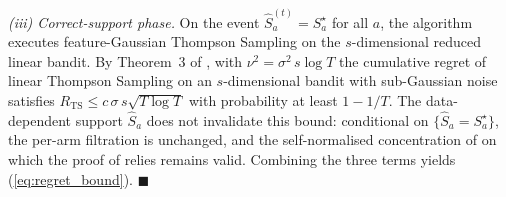 \documentclass[10pt,journal,twoside,twocolumn]{IEEEtran}
\begin{document}
\emph{(iii) Correct-support phase.} On the event $\hat{S}_a^{(t)} = S^\star_a$ for all $a$, the algorithm executes feature-Gaussian Thompson Sampling on the $s$-dimensional reduced linear bandit. By Theorem~3 of \cite{abeille2017linear}, with $\nu^2 = \sigma^2\, s\log T$ the cumulative regret of linear Thompson Sampling on an $s$-dimensional bandit with sub-Gaussian noise satisfies $R_{\mathrm{TS}} \leq c\,\sigma\,s\sqrt{T\log T}$ with probability at least $1 - 1/T$. The data-dependent support $\hat{S}_a$ does not invalidate this bound: conditional on $\{\hat{S}_a = S^\star_a\}$, the per-arm filtration is unchanged, and the self-normalised concentration of \cite{abbasi2011improved} on which the proof of \cite[Thm.~3]{abeille2017linear} relies remains valid. Combining the three terms yields (\ref{eq:regret_bound}). \hfill$\blacksquare$



\end{document}
